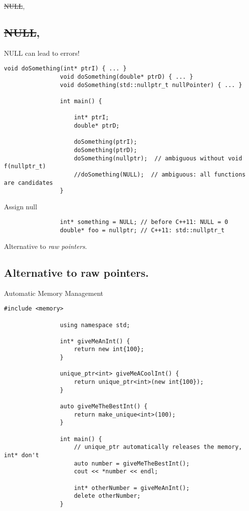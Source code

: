 \documentclass{beamer}
\newcommand{\normalSizeItem}[1] {
  \normalsize{\item #1}
}
\begin{document}
		\begin{frame}[fragile]{\sout{NULL}, }	
			\subsection{\sout{NULL}, }
			\begin{itemize}
			
				\normalSizeItem { NULL can lead to errors! }
				\begin{lstlisting}[basicstyle={\tiny\ttfamily}]
				void doSomething(int* ptrI) { ... }
				void doSomething(double* ptrD) { ... }
				void doSomething(std::nullptr_t nullPointer) { ... } 
				
				int main() {
				
					int* ptrI;
					double* ptrD;
				 
					doSomething(ptrI);
					doSomething(ptrD);
					doSomething(nullptr);  // ambiguous without void f(nullptr_t)
					//doSomething(NULL);  // ambiguous: all functions are candidates
				}
				\end{lstlisting}
				
				\normalSizeItem { Assign null}
				\begin{lstlisting}
				int* something = NULL; // before C++11: NULL = 0
				double* foo = nullptr; // C++11: std::nullptr_t
				\end{lstlisting}
				
			\end{itemize}
		\end{frame}
		
		\begin{frame}[fragile]{Alternative to \textit{raw pointers}. }	
			\subsection{Alternative to raw pointers. }
			\begin{itemize}
			
				\normalSizeItem { Automatic Memory Management }
				\begin{lstlisting}[basicstyle={\tiny\ttfamily}]
				#include <memory>
				
				using namespace std;
				
				int* giveMeAnInt() { 
					return new int{100};
				}
				
				unique_ptr<int> giveMeACoolInt() {
					return unique_ptr<int>(new int{100});
				}
				
				auto giveMeTheBestInt() {
					return make_unique<int>(100);
				}
				
				int main() {	
					// unique_ptr automatically releases the memory, int* don't
					auto number = giveMeTheBestInt();
					cout << *number << endl;
					
					int* otherNumber = giveMeAnInt();
					delete otherNumber;
				}
				\end{lstlisting}				
			\end{itemize}
		\end{frame}
		
\end{document}
